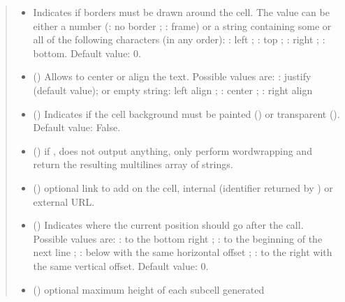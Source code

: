 \documentclass[letterpaper,10pt,english]{sphinxmanual}
\begin{document}
\begin{fulllineitems}
\begin{fulllineitems}
\begin{quote}
\begin{description}
\begin{itemize}
\item {} 
\sphinxAtStartPar
{} \textendash{} Indicates if borders must be drawn around the cell.
The value can be either a number (: no border ; : frame)
or a string containing some or all of the following characters
(in any order):
: left ; : top ; : right ; : bottom. Default value: 0.

\item {} 
\sphinxAtStartPar
{} () \textendash{} Allows to center or align the text. Possible values are:
: justify (default value);  or empty string: left align ;
: center ; : right align

\item {} 
\sphinxAtStartPar
{} () \textendash{} Indicates if the cell background must be painted ()
or transparent (). Default value: False.

\item {} 
\sphinxAtStartPar
{} () \textendash{} if , does not output anything, only perform
word\sphinxhyphen{}wrapping and return the resulting multi\sphinxhyphen{}lines array of strings.

\item {} 
\sphinxAtStartPar
{} () \textendash{} optional link to add on the cell, internal
(identifier returned by ) or external URL.

\item {} 
\sphinxAtStartPar
{} () \textendash{} Indicates where the current position should go after the call.
Possible values are: : to the bottom right ; : to the beginning
of the next line ; : below with the same horizontal offset ;
: to the right with the same vertical offset. Default value: 0.

\item {} 
\sphinxAtStartPar
{} () \textendash{} optional maximum height of each sub\sphinxhyphen{}cell generated


\end{itemize}
\end{description}
\end{quote}
\end{fulllineitems}
\end{fulllineitems}
\end{document}

